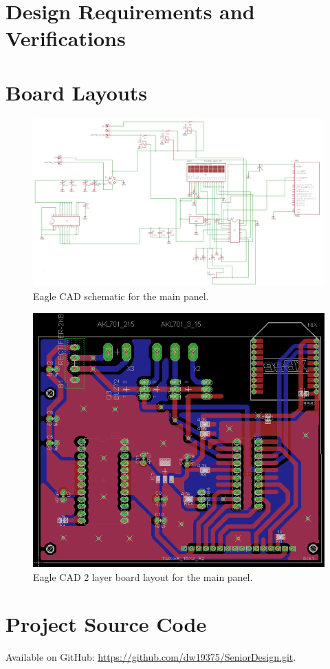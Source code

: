 \appendix
\pagebreak
\section{Design Requirements and Verifications}
\label{reqtab}



\section{Board Layouts}

\begin{figure}[htb]
\centering
\includegraphics[width=.99\textwidth]{mainboard_schematic.png}
\caption{Eagle CAD schematic for the main panel.}
\label{fig:mainboard_schematic}
\end{figure}

\begin{figure}[htb]
\centering
\includegraphics[width=.99\textwidth]{mainboard_layout.png}
\caption{Eagle CAD 2 layer board layout for the main panel.}
\label{fig:mainboard_layout}
\end{figure}

\section{Project Source Code}
Available on GitHub: \url{https://github.com/dw19375/SeniorDesign.git}.
